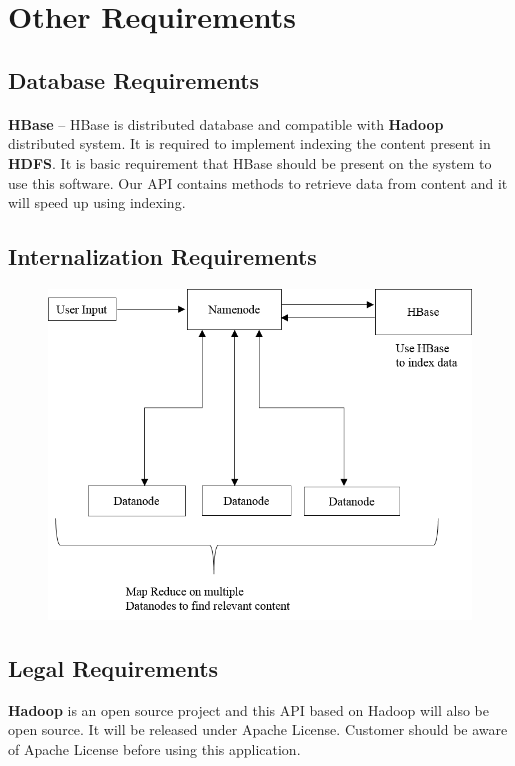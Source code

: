 \documentclass[11pt,letterpaper]{article}
\begin{document}
\newpage

\section{Other Requirements}

\subsection{Database Requirements}
\paragraph{}
\textbf{HBase} – HBase is distributed database and compatible with \textbf{Hadoop} distributed system. It is required to implement indexing the content present in \textbf{HDFS}. It is basic requirement that HBase should be present on the system to use this software. Our API contains methods to retrieve data from content and it will speed up using indexing. 

\subsection{Internalization Requirements}
\begin{figure}[h]
\includegraphics{internalization}
\centering
\end{figure}

\subsection{Legal Requirements}
\textbf{Hadoop} is an open source project and this API based on Hadoop will also be open source. It will be released under Apache License. Customer should be aware of Apache License before using this application.
\end{document}
